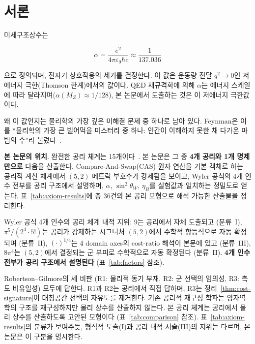 \documentclass[entropy,article,submit,pdftex,oneauthor]{Definitions/mdpi}
\begin{document}
\section{서론}
\label{sec:intro}

미세구조상수는
\begin{linenomath}
\begin{equation}
\alpha = \frac{e^2}{4\pi\varepsilon_0 \hbar c} \approx \frac{1}{137.036}
\label{eq:alpha-def}
\end{equation}
\end{linenomath}
으로 정의되며, 전자기 상호작용의 세기를 결정한다. 이 값은 운동량 전달 $q^2 \to 0$인 저에너지 극한(Thomson 한계)에서의 값이다. QED 재규격화에 의해 $\alpha$는 에너지 스케일에 따라 달라지며($\alpha(M_Z) \approx 1/128$), 본 논문에서 도출하는 것은 이 저에너지 극한값이다.

왜 이 값인지는 물리학의 가장 깊은 미해결 문제 중 하나로 남아 있다. Feynman은 이를 ``물리학의 가장 큰 빌어먹을 미스터리 중 하나: 인간이 이해하지 못한 채 다가온 마법의 수''라 불렀다~\cite{feynman1985}.

\textbf{본 논문의 위치}. 완전한 공리 체계는 15개이다~\cite{han2026}. 본 논문은 그 중 \textbf{4개 공리와 1개 명제만으로} 다음을 산출한다. Compare-And-Swap(CAS) 원자 연산을 기본 객체로 하는 공리적 계산 체계에서 $(5,2)$ 메트릭 부호수가 강제됨을 보이고, Wyler 공식의 4개 인수 전부를 공리 구조에서 설명하며, $\alpha$, $\sin^2\theta_W$, $\eta_B$를 실험값과 일치하는 정밀도로 얻는다. 표~\ref{tab:axiom-results}에 총 36건의 본 공리 모형으로 해석 가능한 산출물을 정리한다.

Wyler 공식 4개 인수의 공리 체계 내적 지위: $9$는 공리에서 자체 도출되고 (분류~I), $\pi^5/(2^4 \cdot 5!)$는 공리가 강제하는 시그니처 $(5,2)$에서 수학적 항등식으로 자동 확정되며 (분류~II), $(\cdot)^{1/4}$는 4 domain axes의 cost-ratio 해석이 본문에 있고 (분류~III), $8\pi^4$는 $(5,2)$에서 결정되는 군 부피로 수학적으로 자동 확정된다 (분류~II). \textbf{4개 인수 전부가 공리 구조에서 설명된다} (표~\ref{tab:factors} 참조).

Robertson--Gilmore의 세 비판 (R1: 물리적 동기 부재, R2: 군 선택의 임의성, R3: 측도 비유일성) 모두에 답한다. R1과 R2는 공리에서 직접 답하며, R3는 정리~\ref{thm:cost-signature}이 대칭공간 선택의 자유도를 제거한다. 기존 공리적 재구성 학파는 양자역학의 구조를 재구성하지만 물리 상수를 산출하지 않는다. 본 공리 체계는 공리에서 물리 상수를 산출하도록 고안된 모형이다 (표~\ref{tab:comparison} 참조). 표~\ref{tab:axiom-results}의 분류가 보여주듯, 형식적 도출(I)과 공리 내적 서술(III)의 지위는 다르며, 본 논문은 이 구분을 명시한다.
\end{document}
